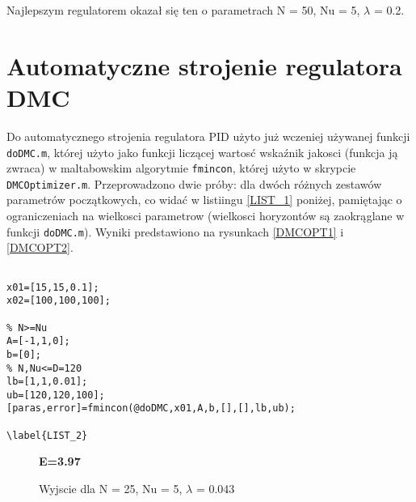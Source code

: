 Najlepszym regulatorem okazał się ten o parametrach N = 50, Nu = 5, $\lambda$ = 0.2.

\FloatBarrier

\section{Automatyczne strojenie regulatora DMC}


Do automatycznego strojenia regulatora PID użyto już wczeniej używanej funkcji \verb+doDMC.m+, której użyto jako funkcji liczącej wartosć wskaźnik jakosci (funkcja ją zwraca) w maltabowskim algorytmie \verb+fmincon+, której użyto w skrypcie \verb+DMCOptimizer.m+. Przeprowadzono dwie próby: dla  dwóch różnych zestawów parametrów początkowych, co widać w listiingu \ref{LIST_1} poniżej, pamiętając o ograniczeniach na wielkosci parametrow (wielkosci horyzontów są zaokrąglane w funkcji  \verb+doDMC.m+). Wyniki predstawiono na rysunkach \ref{DMCOPT1} i \ref{DMCOPT2}.

\begin{lstlisting}[style=custommatlab,frame=single,label={zad4_sim_lst},caption={Implementacja automatycznego strojenia DMC},captionpos=b]

x01=[15,15,0.1];
x02=[100,100,100];

% N>=Nu
A=[-1,1,0];
b=[0];
% N,Nu<=D=120
lb=[1,1,0.01];
ub=[120,120,100];
[paras,error]=fmincon(@doDMC,x01,A,b,[],[],lb,ub);

\label{LIST_2}
\end{lstlisting}


\begin{figure}[t]
    
    \textbf{E=\num{3.97}}
    \centering
    \caption{Wyjscie dla N = 25, Nu = 5, $\lambda$ = \num{0.043}}
    \label {PID_AUTO1}
\end{figure}

